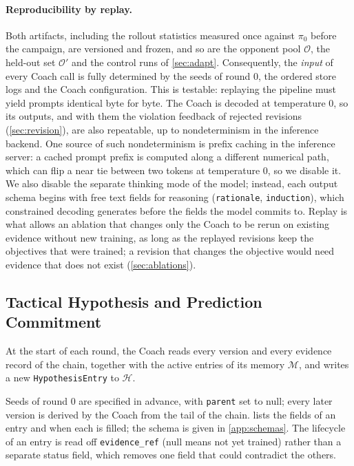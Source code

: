 \documentclass[11pt]{article}
\newcommand{\Hst}{\mathcal{H}}           %
\newcommand{\Mst}{\mathcal{M}}           %
\newcommand{\opp}{\mathcal{O}}           %
\newcommand{\code}[1]{\texttt{\small #1}}
\begin{document}
\paragraph{Reproducibility by replay.}
Both artifacts, including the rollout statistics measured once against $\pi_0$ before the campaign, are versioned and frozen, and so are the opponent pool $\opp$, the held-out set $\opp'$ and the control runs of \cref{sec:adapt}.
Consequently, the \emph{input} of every Coach call is fully determined by the seeds of round 0, the ordered store logs and the Coach configuration.
This is testable: replaying the pipeline must yield prompts identical byte for byte.
The Coach is decoded at temperature 0, so its outputs, and with them the violation feedback of rejected revisions (\cref{sec:revision}), are also repeatable, up to nondeterminism in the inference backend.
One source of such nondeterminism is prefix caching in the inference server: a cached prompt prefix is computed along a different numerical path, which can flip a near tie between two tokens at temperature 0, so we disable it.
We also disable the separate thinking mode of the model; instead, each output schema begins with free text fields for reasoning (\code{rationale}, \code{induction}), which constrained decoding generates before the fields the model commits to.
Replay is what allows an ablation that changes only the Coach to be rerun on existing evidence without new training, as long as the replayed revisions keep the objectives that were trained; a revision that changes the objective would need evidence that does not exist (\cref{sec:ablations}).

\subsection{Tactical Hypothesis and Prediction Commitment}
\label{sec:hypothesis}

At the start of each round, the Coach reads every version and every evidence record of the chain, together with the active entries of its memory $\Mst$, and writes a new \code{HypothesisEntry} to $\Hst$.

Seeds of round 0 are specified in advance, with \code{parent} set to null; every later version is derived by the Coach from the tail of the chain.
 lists the fields of an entry and when each is filled; the schema is given in \cref{app:schemas}.
The lifecycle of an entry is read off \code{evidence\_ref} (null means not yet trained) rather than a separate status field, which removes one field that could contradict the others.
\end{document}
